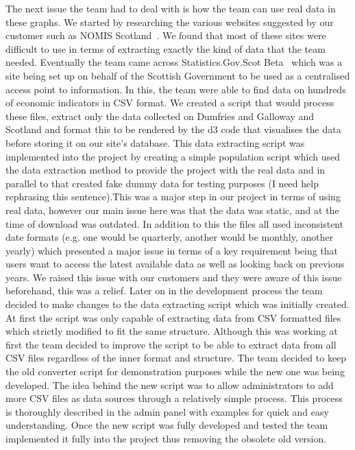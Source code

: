 \documentclass{l3proj}
\begin{document}
The next issue the team had to deal with is how the team can use real data in these graphs. We started by researching the various websites
suggested by our customer such as NOMIS Scotland~\cite{NOMISScot}. We found that most of these sites were difficult to use in terms of extracting
exactly the kind of data that the team needed. Eventually the team came across Statistics.Gov.Scot Beta~\cite{StatisticsScotBeta} which was a site being set up on behalf of
the Scottish Government to be used as a centralised access point to information. In this, the team were able to find data on
hundreds of economic indicators in CSV format. We created a script that would process these files, extract only the data collected
on Dumfries and Galloway and Scotland and format this to be rendered by the d3 code that visualises the data before storing it on
our site's database. This data extracting script was implemented into the project by creating a simple population script which used the data extraction method to provide the project with the real data and in parallel to that created fake dummy data for testing purposes (I need help rephrasing this sentence).This was a major step in our project in terms of using real data, however our main issue here was that the
data was static, and at the time of download was outdated. In addition to this the files all used inconsistent date formats (e.g.
one would be quarterly, another would be monthly, another yearly) which presented a major issue in terms of a key requirement
being that users want to access the latest available data as well as looking back on previous years. We raised this issue
with our customers and they were aware of this issue beforehand, this was a relief. Later on in the development process the team decided to make changes to the data extracting script which was initially created. At first the script was only capable of extracting data from CSV formatted files which strictly modified to fit the same structure. Although this was working at first the team decided to improve the script to be able to extract data from all CSV files regardless of the inner format and structure. The team decided to keep the old converter script for demonstration purposes while the new one was being developed. The idea behind the new script was to allow administrators to add more CSV files as data sources through a relatively simple process. This process is thoroughly described in the admin panel with examples for quick and easy understanding.
Once the new script was fully developed and tested the team implemented it fully into the project thus removing the obsolete old version.
\end{document}
